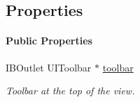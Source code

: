 \subsection*{Properties}
\begin{Indent}\paragraph*{Public Properties}
\begin{DoxyCompactItemize}
\item 
\hypertarget{interface_p_c_detail_view_controller_a420c181efab7c836db9199ead913a55e}{
IBOutlet UIToolbar $\ast$ \hyperlink{interface_p_c_detail_view_controller_a420c181efab7c836db9199ead913a55e}{toolbar}}
\label{interface_p_c_detail_view_controller_a420c181efab7c836db9199ead913a55e}

\begin{DoxyCompactList}\small\item\em Toolbar at the top of the view. \end{DoxyCompactList}\end{DoxyCompactItemize}
\end{Indent}
